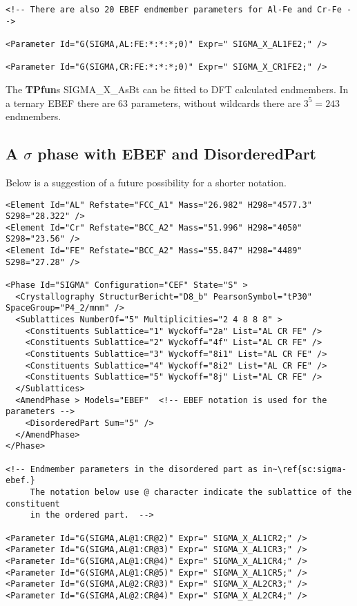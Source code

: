 \documentclass[preprint,review,12pt]{elsarticle}
\begin{document}
\begin{appendix}
{\begin{verbatim}
<!-- There are also 20 EBEF endmember parameters for Al-Fe and Cr-Fe -->

<Parameter Id="G(SIGMA,AL:FE:*:*:*;0)" Expr=" SIGMA_X_AL1FE2;" />

<Parameter Id="G(SIGMA,CR:FE:*:*:*;0)" Expr=" SIGMA_X_CR1FE2;" />

\end{verbatim}
}

The {\bf TPfun}s SIGMA\_X\_AsBt can be fitted to DFT calculated endmembers.
In a ternary EBEF there are 63 parameters, without wildcards there are
$3^5 = 243$ endmembers.

\subsection{A $\sigma$ phase with EBEF and DisorderedPart}\label{sc:sigma-ebef2}

Below is a suggestion of a future possibility for a shorter notation.

{\small
\begin{verbatim}
<Element Id="AL" Refstate="FCC_A1" Mass="26.982" H298="4577.3" S298="28.322" />
<Element Id="Cr" Refstate="BCC_A2" Mass="51.996" H298="4050" S298="23.56" />
<Element Id="FE" Refstate="BCC_A2" Mass="55.847" H298="4489" S298="27.28" />

<Phase Id="SIGMA" Configuration="CEF" State="S" >
  <Crystallography StructurBericht="D8_b" PearsonSymbol="tP30" SpaceGroup="P4_2/mnm" />
  <Sublattices NumberOf="5" Multiplicities="2 4 8 8 8" >
    <Constituents Sublattice="1" Wyckoff="2a" List="AL CR FE" />
    <Constituents Sublattice="2" Wyckoff="4f" List="AL CR FE" />
    <Constituents Sublattice="3" Wyckoff="8i1" List="AL CR FE" />
    <Constituents Sublattice="4" Wyckoff="8i2" List="AL CR FE" />
    <Constituents Sublattice="5" Wyckoff="8j" List="AL CR FE" />
  </Sublattices>
  <AmendPhase > Models="EBEF"  <!-- EBEF notation is used for the parameters -->
    <DisorderedPart Sum="5" />
  </AmendPhase>
</Phase>

<!-- Endmember parameters in the disordered part as in~\ref{sc:sigma-ebef.}
     The notation below use @ character indicate the sublattice of the constituent
     in the ordered part.  -->

<Parameter Id="G(SIGMA,AL@1:CR@2)" Expr=" SIGMA_X_AL1CR2;" />
<Parameter Id="G(SIGMA,AL@1:CR@3)" Expr=" SIGMA_X_AL1CR3;" />
<Parameter Id="G(SIGMA,AL@1:CR@4)" Expr=" SIGMA_X_AL1CR4;" />
<Parameter Id="G(SIGMA,AL@1:CR@5)" Expr=" SIGMA_X_AL1CR5;" />
<Parameter Id="G(SIGMA,AL@2:CR@3)" Expr=" SIGMA_X_AL2CR3;" />
<Parameter Id="G(SIGMA,AL@2:CR@4)" Expr=" SIGMA_X_AL2CR4;" />


\end{verbatim}}
\end{appendix}
\end{document}
